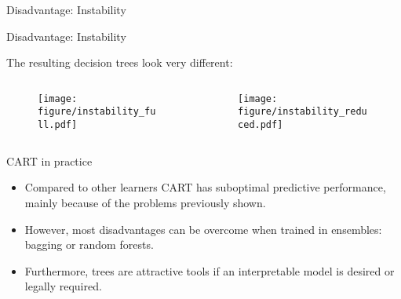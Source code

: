 \documentclass[11pt,compress,t,notes=noshow, xcolor=table]{beamer}
\begin{document}
\begin{vbframe}{Disadvantage: Instability}


\end{vbframe}

\begin{vbframe}{Disadvantage: Instability}

The resulting decision trees look very different:

\begin{columns}
\begin{column}{0.5\textwidth}
\begin{figure}
\texttt{[image: figure/instability\_full.pdf]} 
\end{figure}
\end{column}
\begin{column}{0.5\textwidth}
\begin{figure}
\texttt{[image: figure/instability\_reduced.pdf]} 
\end{figure}
\end{column}
\end{columns}

\end{vbframe}

\begin{vbframe}{CART in practice}

\begin{itemize}
\item Compared to other learners CART has suboptimal predictive performance, mainly because of the problems previously shown.
\item However, most disadvantages can be overcome when trained in ensembles: bagging or random forests.
\item Furthermore, trees are attractive tools if an interpretable model is desired or legally required.
\end{itemize}



\end{vbframe}
\end{document}
